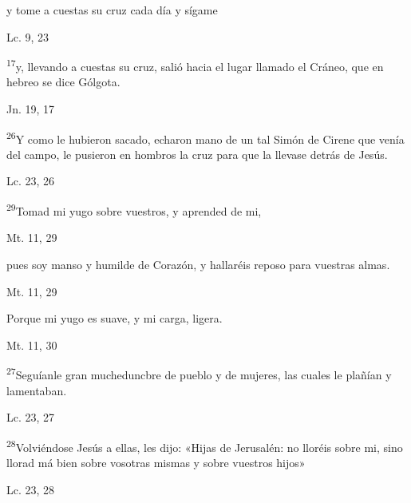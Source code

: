 \documentclass[a4paper,11pt]{article}
\begin{document}
      
      y tome a cuestas su cruz cada día y sígame
      \begin{flushright}
        Lc. 9, 23
      \end{flushright}

      
      \textsuperscript{17}y, llevando a cuestas su cruz, salió hacia el lugar llamado el Cráneo, que en hebreo se dice Gólgota.
      \begin{flushright}
        Jn. 19, 17
      \end{flushright}

      
      \textsuperscript{26}Y como le hubieron sacado, echaron mano de un tal Simón de Cirene que venía del campo, le pusieron en hombros la cruz para que la llevase
      detrás de Jesús.
      \begin{flushright}
        Lc. 23, 26
      \end{flushright}

      
      \textsuperscript{29}Tomad mi yugo sobre vuestros, y aprended de mi, 
      \begin{flushright}
        Mt. 11, 29  
      \end{flushright}

      
      pues soy manso y humilde de Corazón, y hallaréis reposo para vuestras almas.
      \begin{flushright}
        Mt. 11, 29
      \end{flushright}

      
      Porque mi yugo es suave, y mi carga, ligera.
      \begin{flushright}
        Mt. 11, 30
      \end{flushright}

      
      \textsuperscript{27}Seguíanle gran mucheduncbre de pueblo y de mujeres, las cuales le plañían y lamentaban.
      \begin{flushright}
        Lc. 23, 27
      \end{flushright}

      
      \textsuperscript{28}Volviéndose Jesús a ellas, les dijo: «Hijas de Jerusalén: no lloréis sobre mi, sino llorad má bien sobre vosotras mismas y sobre
      vuestros hijos»
      \begin{flushright}
        Lc. 23, 28
      \end{flushright}
\end{document}
